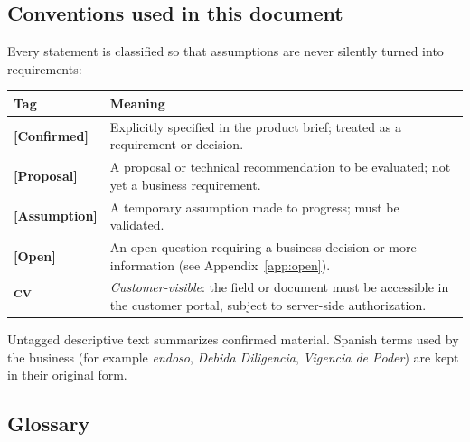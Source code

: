 \documentclass[11pt,a4paper]{article}
\newcommand{\tagconf}{\textcolor{green!45!black}{\textbf{[Confirmed]}}}
\newcommand{\tagprop}{\textcolor{orange!80!black}{\textbf{[Proposal]}}}
\newcommand{\tagassm}{\textcolor{blue!60!black}{\textbf{[Assumption]}}}
\newcommand{\tagopen}{\textcolor{red!70!black}{\textbf{[Open]}}}
\newcommand{\cv}{\textsuperscript{\textcolor{panablue}{\textbf{CV}}}}
\begin{document}
\subsection{Conventions used in this document}

Every statement is classified so that assumptions are never silently turned into requirements:

\begin{longtable}{@{}L{3.2cm}L{12.6cm}@{}}
	\toprule
	\textbf{Tag} & \textbf{Meaning}                                                                                                                \\
	\midrule
	\endhead
	\tagconf{}   & Explicitly specified in the product brief; treated as a requirement or decision.                                                \\
	\tagprop{}   & A proposal or technical recommendation to be evaluated; not yet a
	business requirement.                                                                                                                          \\
	\tagassm{}   & A temporary assumption made to progress; must be validated.                                                                     \\
	\tagopen{}   & An open question requiring a business decision or more information (see Appendix~\ref{app:open}).                               \\
	\cv{}        & \emph{Customer-visible}: the field or document must be accessible in the customer portal, subject to server-side authorization. \\
	\bottomrule
\end{longtable}

Untagged descriptive text summarizes confirmed material. Spanish terms used by the business (for example \emph{endoso}, \emph{Debida Diligencia}, \emph{Vigencia de Poder}) are kept in their original form.

\subsection{Glossary}
\end{document}
